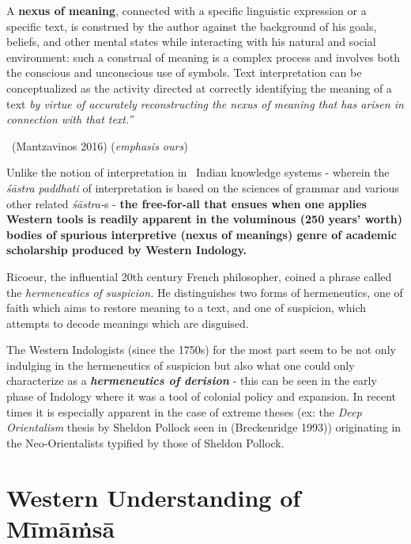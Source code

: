 \begin{myquote}
A \textbf{nexus of meaning}, connected with a specific linguistic expression or a specific text, is construed by the author against the background of his goals, beliefs, and other mental states while interacting with his natural and social environment: such a construal of meaning is a complex process and involves both the conscious and unconscious use of symbols. Text interpretation can be conceptualized as the activity directed at correctly identifying the meaning of a text \textit{by virtue of accurately reconstructing the nexus of meaning that has arisen in connection with that text.” }

~\hfill (Mantzavinos 2016) (\textit{emphasis ours})
\end{myquote}

Unlike the notion of interpretation in  Indian knowledge systems - wherein the \textit{śāstra paddhati} of interpretation is based on the sciences of grammar and various other related \textit{śāstra-}s - \textbf{the free-for-all that ensues when one applies Western tools is readily apparent in the voluminous (250 years’ worth) bodies of spurious interpretive (nexus of meanings) genre of academic scholarship produced by Western Indology.}

\newpage

Ricoeur, the influential 20th century French philosopher, coined a phrase called the \textit{hermeneutics of suspicion.} He distinguishes two forms of hermeneutics, one of faith which aims to restore meaning to a text, and one of suspicion, which attempts to decode meanings which are disguised.

The Western Indologists (since the 1750s) for the most part seem to be not only indulging in the hermeneutics of suspicion but also what one could only characterize as a \textbf{\textit{hermeneutics of derision}} - this can be seen in the early phase of Indology where it was a tool of colonial policy and expansion. In recent times it is especially apparent in the case of extreme theses (ex: the \textit{Deep Orientalism} thesis by Sheldon Pollock seen in (Breckenridge 1993)) originating in the Neo-Orientalists typified by those of Sheldon Pollock.


\section*{Western Understanding of Mīmāṁsā}

